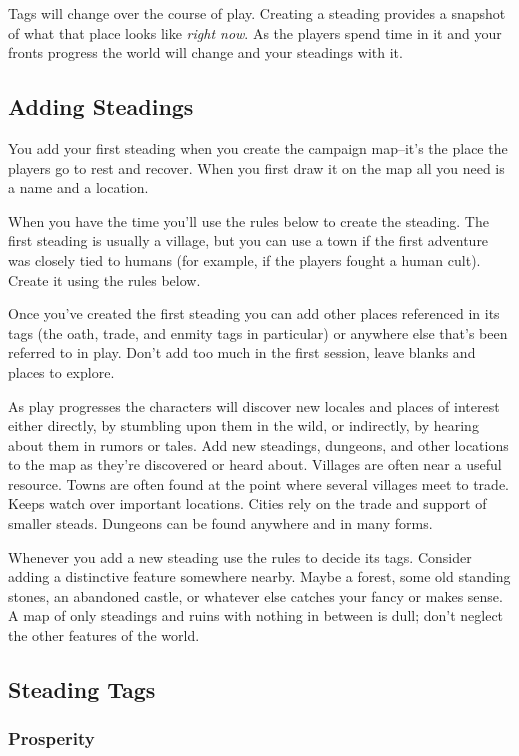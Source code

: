 Tags will change over the course of play. Creating a steading provides a snapshot of what that place looks like \emph{right now}. As the players spend time in it and your fronts progress the world will change and your steadings with it.
\subsection{Adding Steadings}


You add your first steading when you create the campaign map--it's the place the players go to rest and recover. When you first draw it on the map all you need is a name and a location.


When you have the time you'll use the rules below to create the steading. The first steading is usually a village, but you can use a town if the first adventure was closely tied to humans (for example, if the players fought a human cult). Create it using the rules below.


Once you've created the first steading you can add other places referenced in its tags (the oath, trade, and enmity tags in particular) or anywhere else that's been referred to in play. Don't add too much in the first session, leave blanks and places to explore.


As play progresses the characters will discover new locales and places of interest either directly, by stumbling upon them in the wild, or indirectly, by hearing about them in rumors or tales. Add new steadings, dungeons, and other locations to the map as they're discovered or heard about. Villages are often near a useful resource. Towns are often found at the point where several villages meet to trade. Keeps watch over important locations. Cities rely on the trade and support of smaller steads. Dungeons can be found anywhere and in many forms.


Whenever you add a new steading use the rules to decide its tags. Consider adding a distinctive feature somewhere nearby. Maybe a forest, some old standing stones, an abandoned castle, or whatever else catches your fancy or makes sense. A map of only steadings and ruins with nothing in between is dull; don't neglect the other features of the world.
\subsection{Steading Tags}
\subsubsection{Prosperity}

